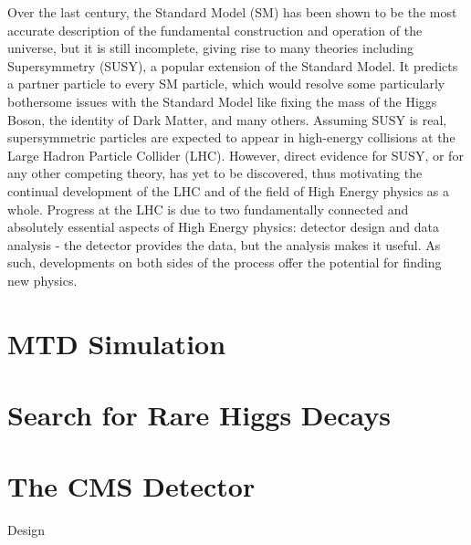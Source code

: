 \documentclass[oneside,12pt,final]{sty/ucthesis-CA2012}
\begin{document}
\begin{mainmatter}
Over the last century, the Standard Model (SM) has been shown to be the most accurate description of the fundamental construction and operation of the universe, but it is still incomplete, giving rise to many theories including Supersymmetry (SUSY), a popular extension of the Standard Model. It predicts a partner particle to every SM particle, which would resolve some particularly bothersome issues with the Standard Model like fixing the mass of the Higgs Boson, the identity of Dark Matter, and many others. Assuming SUSY is real, supersymmetric particles are expected to appear in high-energy collisions at the Large Hadron Particle Collider (LHC). However, direct evidence for SUSY, or for any other competing theory, has yet to be discovered, thus motivating the continual development of the LHC and of the field of High Energy physics as a whole. Progress at the LHC is due to two fundamentally connected and absolutely essential aspects of High Energy physics: detector design and data analysis - the detector provides the data, but the analysis makes it useful. As such, developments on both sides of the process offer the potential for finding new physics.

\chapter{MTD Simulation}


\chapter{Search for Rare Higgs Decays}


\appendix

\dsp

\chapter{The CMS Detector}{\label{appendix:a}}
\begin{section}{Design}


\end{section}
\end{mainmatter}
\end{document}
